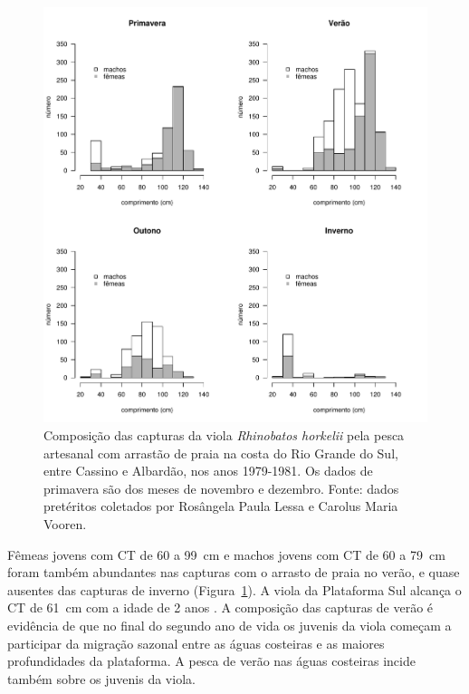\documentclass[a4paper,11pt,twoside,showtrims,onecolumn,openright,final]{memoir}
\begin{document}
\begin{figure}
\begin{center}
\includegraphics[width=\textwidth]{VIOLA_CTXEPOCAS}
\end{center}
\caption[Composição das capturas da viola \emph{Rhinobatos horkelii}
	 pela pesca artesanal com arrastão de praia na costa do Rio Grande do Sul]
	{Composição das capturas da viola \emph{Rhinobatos horkelii}
	 pela pesca artesanal com arrastão de praia na costa do Rio Grande do Sul, 
	 entre Cassino e Albardão, nos anos  1979-1981. Os dados de primavera são dos meses de novembro e dezembro.  
	 Fonte: dados pretéritos coletados por 
	 Rosângela Paula Lessa e Carolus Maria Vooren.}
\label{fig:viola-hist-ct1980}
\end{figure}


Fêmeas jovens com CT de 60 a 99~cm e machos jovens com CT de 60 a 79~cm foram 
também abundantes nas capturas com o arrasto de praia no verão, e quase ausentes 
das capturas de inverno (Figura~\ref{fig:viola-hist-ct1980}). 
A viola da Plataforma Sul alcança o CT de 61~cm com a idade de 2 anos \citep{lessa1982}. %
A composição das capturas de verão é evidência de que no final do segundo ano de vida 
os juvenis da viola começam a participar da migração sazonal entre as águas costeiras 
e as maiores profundidades da plataforma. A pesca de verão nas águas costeiras incide 
também sobre os juvenis da viola.
\end{document}

